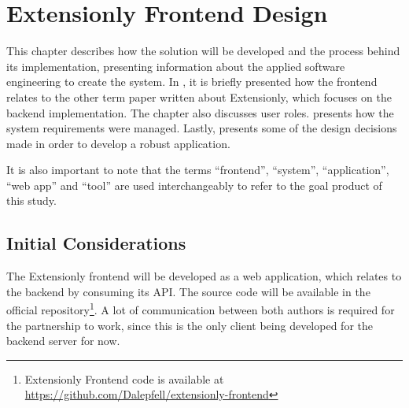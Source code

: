 \chapter{Extensionly Frontend Design}\label{extensionly}

This chapter describes how the solution will be developed and the process behind its implementation, presenting information about the applied software engineering to create the system. In , it is briefly presented how the frontend relates to the other term paper written about Extensionly, which focuses on the backend implementation. The chapter also discusses user roles.  presents how the system requirements were managed. Lastly,  presents some of the design decisions made in order to develop a robust application.

It is also important to note that the terms ``frontend'', ``system'', ``application'', ``web app'' and ``tool'' are used interchangeably to refer to the goal product of this study.

\section{Initial Considerations}\label{ext:initial-considerations}

The Extensionly frontend will be developed as a web application, which relates to the backend by consuming its \ac{API}. The source code will be available in the official repository\footnote{Extensionly Frontend code is available at \url{https://github.com/Dalepfell/extensionly-frontend}}. A lot of communication between both authors is required for the partnership to work, since this is the only client being developed for the backend server for now.

